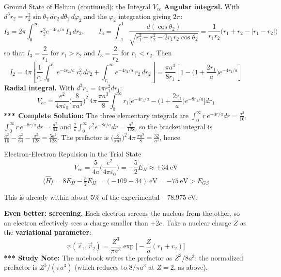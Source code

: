 \documentclass[11pt,a4paper]{article}
\begin{document}
\begin{prob}{Ground State of Helium (continued): the Integral $V_{ee}$}
\textbf{Angular integral.} With $d^3r_2 = r_2^2\sin\theta_2\,dr_2\,d\theta_2\,d\varphi_2$ and the $\varphi_2$ integration giving $2\pi$:
\[
I_2 = 2\pi\int_0^\infty r_2^2e^{-4r_2/a}\,I_3\,dr_2, \qquad I_3 = \int_{-1}^{1}\frac{d(\cos\theta_2)}{\sqrt{r_1^2+r_2^2-2r_1r_2\cos\theta_2}} = \frac{1}{r_1r_2}\big(r_1+r_2-|r_1-r_2|\big)
\]
so that $I_3 = \dfrac{2}{r_1}$ for $r_1>r_2$ and $I_3 = \dfrac2{r_2}$ for $r_1<r_2$. Then
\[
I_2 = 4\pi\left[\frac1{r_1}\int_0^{r_1}e^{-4r_2/a}\,r_2^2\,dr_2 + \int_{r_1}^\infty e^{-4r_2/a}\,r_2\,dr_2\right]
= \frac{\pi a^3}{8r_1}\left[1 - \Big(1+\frac{2r_1}{a}\Big)e^{-4r_1/a}\right]
\]
\textbf{Radial integral.} With $d^3r_1 = 4\pi r_1^2dr_1$:
\[
V_{ee} = \frac{e^2}{4\pi\varepsilon_0}\Big(\frac8{\pi a^3}\Big)^2\,4\pi\,\frac{\pi a^3}{8}\int_0^\infty r_1\Big[e^{-4r_1/a} - \Big(1+\frac{2r_1}a\Big)e^{-8r_1/a}\Big]dr_1
\]
\textbf{*** Complete Solution:} The three elementary integrals are $\int_0^\infty r\,e^{-4r/a}dr = \frac{a^2}{16}$, $\int_0^\infty r\,e^{-8r/a}dr = \frac{a^2}{64}$ and $\frac2a\int_0^\infty r^2e^{-8r/a}dr = \frac{a^2}{128}$, so the bracket integral is $\frac{a^2}{16}-\frac{a^2}{64}-\frac{a^2}{128} = \frac{5a^2}{128}$. The prefactor is $\big(\frac{8}{\pi a^3}\big)^2\,4\pi\,\frac{\pi a^3}{8} = \frac{32}{a^3}$, hence
\begin{thm}{Electron-Electron Repulsion in the Trial State}
\[
V_{ee} = \frac{5}{4a}\Big(\frac{e^2}{4\pi\varepsilon_0}\Big) = -\frac52E_H \approx +34\ \text{eV}
\]
\[
\langle\hat H\rangle = 8E_H - \tfrac52E_H = (-109+34)\ \text{eV} = -75\ \text{eV} > E_{GS}
\]
\end{thm}
This is already within about 5\% of the experimental $-78.975$ eV.

\textbf{Even better: screening.} Each electron screens the nucleus from the other, so an electron effectively sees a charge smaller than $+2e$. Take a nuclear charge $Z$ as the \textbf{variational parameter}:
\[
\psi(\vec r_1,\vec r_2) = \frac{Z^3}{\pi a^3}\exp\Big[-\frac Za(r_1+r_2)\Big]
\]
\textbf{*** Study Note:} The notebook writes the prefactor as $Z^3/8a^3$; the normalized prefactor is $Z^3/(\pi a^3)$ (which reduces to $8/\pi a^3$ at $Z=2$, as above).


\end{prob}
\end{document}
